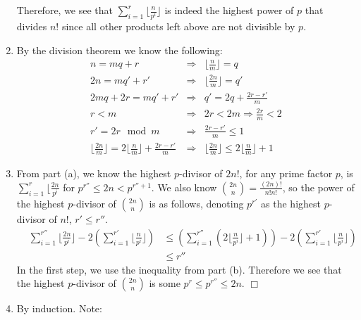 \documentclass[12pt]{article}
\begin{document}
\begin{enumerate}
Therefore, we see that $\sum_{i=1}^r \lfloor \frac{n}{p^i} \rfloor$ is indeed
the highest power of $p$ that divides $n!$
since all other products left above are not
divisible by $p$.
\pagebreak
\item %
By the division theorem we know the following:
%
\begin{eqnarray*}
n = mq + r & \Rightarrow & \lfloor \frac{n}{m} \rfloor = q\\
2n = mq' + r' & \Rightarrow & \lfloor \frac{2n}{m} \rfloor = q'\\
2mq + 2r = mq' + r' & \Rightarrow & q' = 2q + \frac{2r - r'}{m}\\
r < m & \Rightarrow & 2r < 2m \Rightarrow \frac{2r}{m} < 2\\
r' = 2r \mod{m} & \Rightarrow & \frac{2r-r'}{m} \le 1\\
\lfloor \frac{2n}{m} \rfloor = 2\lfloor \frac{n}{m} \rfloor + \frac{2r-r'}{m} & \Rightarrow & \lfloor \frac{2n}{m} \rfloor \le 2\lfloor \frac{n}{m} \rfloor + 1
\end{eqnarray*}

\item %
From part (a), we know the highest $p$-divisor of $2n!$, for any prime factor
$p$, is
$\sum_{i=1}^{r} \lfloor\frac{2n}{p^i}$ for $p^{r''} \le 2n < p^{{r''}+1}$.
We also know $\binom{2n}{n} = \frac{(2n)!}{n!n!}$, so the power of the
highest $p$-divisor
of $\binom{2n}{n}$ is as follows,
denoting $p^{r'}$ as the highest $p$-divisor of $n!$, $r' \le r''$.
%
\begin{eqnarray*}
& \displaystyle  \sum_{i=1}^{r''} \lfloor\frac{2n}{p^i}\rfloor - 2(\sum_{i=1}^{r'} \lfloor\frac{n}{p^i}\rfloor) & \le (\sum_{i=1}^{r''} (2\lfloor\frac{n}{p^i}\rfloor + 1)) - 2(\sum_{i=1}^{r'} \lfloor\frac{n}{p^i}\rfloor)\\
& & \le r''
\end{eqnarray*}
%
In the first step, we use the inequality from part (b).
Therefore we see that the highest $p$-divisor of $\binom{2n}{n}$ is
some $p^r \le p^{r''} \le 2n$.
$\Box$

\item %
By induction. Note:


\end{enumerate}
\end{document}
